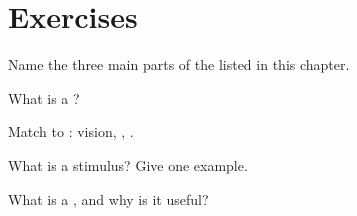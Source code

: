 \section{Exercises}

\begin{exercise}[$\star$]\label{exo:g5:nerves:1}
Name the three main parts of the  listed in this chapter.
\end{exercise}

\begin{exercise}[$\star$]\label{exo:g5:nerves:2}
What is a ?
\end{exercise}

\begin{exercise}[$\star$]\label{exo:g5:nerves:3}
Match  to : vision, , .
\end{exercise}

\begin{exercise}[$\star$]\label{exo:g5:nerves:4}
What is a stimulus? Give one example.
\end{exercise}

\begin{exercise}[$\star\star$]\label{exo:g5:nerves:5}
What is a , and why is it useful?
\end{exercise}

